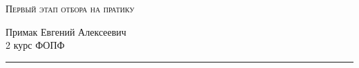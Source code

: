 
\begin{center}
    \LARGE \textsc{Первый этап отбора на пратику}
\end{center}

\begin{flushright}
	Примак Евгений Алексеевич \\
	2 курс ФОПФ
\end{flushright}

\hrule

\phantom{42}

\newpage